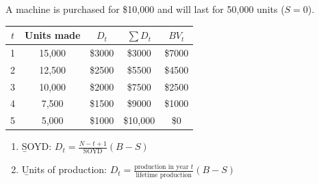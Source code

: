 \begin{example}
    A machine is purchased for \$10,000 and will last for 50,000 units
    ($S = 0$).
    \\
    \begin{center}
    \begin{tabular}{ccccc}
        \toprule
        $t$ & Units made & $D_t$ & $\sum D_t$ & $BV_t$ \\
        \midrule
        1 & 15,000 & \$3000 & \$3000 & \$7000 \\
        2 & 12,500 & \$2500 & \$5500 & \$4500 \\
        3 & 10,000 & \$2000 & \$7500 & \$2500 \\
        4 & 7,500 & \$1500 & \$9000 & \$1000 \\
        5 & 5,000 & \$1000 & \$10,000 & \$0 \\
        \bottomrule
    \end{tabular}
    \end{center}
\end{example}

\begin{enumerate}
    \item \b{SOYD}: $D_t = \frac{N - t + 1}{\text{SOYD}}(B - S)$
    \item \b{Units of production}: $D_t = \frac{\text{production in year } t}{\text{lifetime production}}(B - S)$
\end{enumerate}


